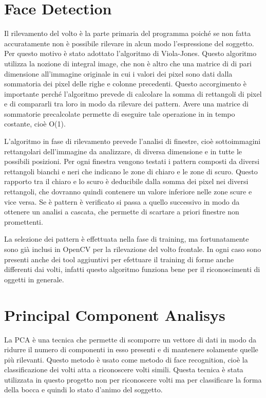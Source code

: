 \documentclass{article}
\begin{document}
\section{Face Detection}
Il rilevamento del volto è la parte primaria del programma poiché se non fatta accuratamente non è possibile rilevare in alcun modo l'espressione del soggetto. Per questo motivo è stato adottato l'algoritmo di Viola-Jones\cite{conf/iccv/ViolaJ01}. Questo algoritmo utilizza la nozione di integral image, che non è altro che una matrice di di pari dimensione all'immagine originale in cui i valori dei pixel sono dati dalla sommatoria dei pixel delle righe e colonne precedenti. Questo accorgimento è importante perché l'algoritmo prevede di calcolare la somma di rettangoli di pixel e di compararli tra loro in modo da rilevare dei pattern. Avere una matrice di sommatorie precalcolate permette di eseguire tale operazione in in tempo costante, cioè O(1)\cite{Jensen:Thesis:2008}.

L'algoritmo in fase di rilevamento prevede l'analisi di finestre, cioè sottoimmagini rettangolari dell'immagine da analizzare, di diversa dimensione e in tutte le possibili posizioni. Per ogni finestra vengono testati i pattern composti da diversi rettangoli bianchi e neri che indicano le zone di chiaro e le zone di scuro. Questo rapporto tra il chiaro e lo scuro è deducibile dalla somma dei pixel nei diversi rettangoli, che dovranno quindi contenere un valore inferiore nelle zone scure e vice versa. Se è pattern è verificato si passa a quello successivo in modo da ottenere un analisi a cascata, che permette di scartare a priori finestre non promettenti.

La selezione dei pattern è effettuata nella fase di training, ma fortunatamente sono già inclusi in OpenCV per la rilevazione del volto frontale. In ogni caso sono presenti anche dei tool aggiuntivi per efettuare il training di forme anche differenti dai volti, infatti questo algoritmo funziona bene per il riconoscimenti di oggetti in generale.

\section{Principal Component Analisys}
La PCA è una tecnica che permette di scomporre un vettore di dati in modo da ridurre il numero di componenti in esso presenti e di mantenere solamente quelle più rilevanti. Questo metodo è usato come metodo di face recognition\cite{turk.pentl-1991:eigenfor:journal:71}, cioè la classificazione dei volti atta a riconoscere volti simili. Questa tecnica è stata utilizzata in questo progetto non per riconoscere volti ma per classificare la forma della bocca e quindi lo stato d'animo del soggetto.
\end{document}
